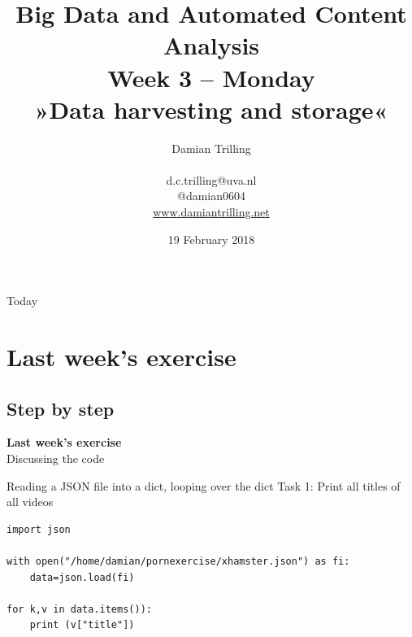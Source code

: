 \documentclass{beamer}
\begin{document}
\title[Big Data and Automated Content Analysis]{\textbf{Big Data and Automated Content Analysis} \\ Week 3 -- Monday \\ »Data harvesting and storage«}
\author[Damian Trilling]{Damian Trilling \\ ~ \\ \footnotesize{d.c.trilling@uva.nl \\@damian0604} \\ \url{www.damiantrilling.net}}
\date{19 February 2018}


\begin{frame}{}
\titlepage
\end{frame}

\begin{frame}{Today}
\tableofcontents
\end{frame}



\section{Last week's exercise}
\subsection{Step by step}
\begin{frame}[plain]
\textbf{Last week's exercise}\\
\vspace{1cm}
Discussing the code
\end{frame}



\begin{frame}[fragile]{Reading a JSON file into a dict, looping over the dict}
Task 1: Print all titles of all videos
\begin{lstlisting}
import json

with open("/home/damian/pornexercise/xhamster.json") as fi:
    data=json.load(fi)

for k,v in data.items()):
    print (v["title"])
            
\end{lstlisting}
\end{frame}
\end{document}
